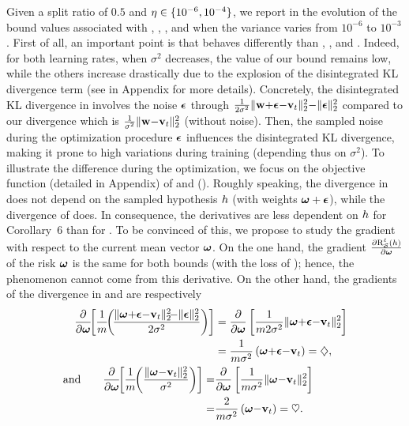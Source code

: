 Given a split ratio of $0.5$ and $\eta\in\{10^{-6}, 10^{-4}\}$, we report in  the evolution of the bound values associated with \algoours, \algorivasplata, \algoblanchard, and \algocatoni when the variance varies from $10^{-6}$ to $10^{-3}$.
First of all, an important point is that \algoours behaves differently than \algorivasplata, \algoblanchard, and \algocatoni.
Indeed, for both learning rates, when $\sigma^2$ decreases, the value of our bound remains low, while the others increase drastically due to the explosion of the disintegrated KL divergence term (see  in Appendix for more details).
Concretely, the disintegrated KL divergence in  involves the noise $\boldsymbol{\epsilon}$  through  $\frac{1}{2\sigma^2}\| \mathbf{w}{+}\boldsymbol{\epsilon}{-}\mathbf{v}_t\|_{2}^2{-}\|\boldsymbol{\epsilon}\|^2_{2}
$ compared to our divergence which is $\frac{1}{\sigma^2}\| \mathbf{w}{-}\mathbf{v}_t\|_{2}^2$ (without noise).
Then, the sampled noise during the optimization procedure $\boldsymbol{\epsilon}$ influences the disintegrated KL divergence, making it prone to high variations during training (depending thus on $\sigma^2$).
To illustrate the difference during the optimization, we focus on the objective function (detailed in Appendix) of  and  ().
Roughly speaking, the divergence in  does not depend on the sampled hypothesis $h$ (with weights $\boldsymbol{\omega}+\boldsymbol{\epsilon}$), while the divergence of  does. 
In consequence, the derivatives are less dependent on $h$ for Corollary~6 than for .
To be convinced of this, we propose to study the gradient with respect to the current mean vector $\boldsymbol{\omega}$.
On the one hand, the gradient $\frac{\partial \text{R}^{\ell}_{\mathcal{S}}(h)}{\partial \boldsymbol{\omega}}$ of the risk \wrt $\boldsymbol{\omega}$ is the same for both bounds (with the loss of \citet{DziugaiteRoy2018}); hence, the phenomenon cannot come from this derivative. 
On the other hand, the gradients of the divergence in   and  are respectively
\begin{align*}
    \frac{\partial}{\partial \omegabf}\!\!\LB\frac{1}{\m}\!\!\LP\!\frac{\| \omegabf{+}\epsilonbf{-}\vbf_\t\|^2_{2}\!{-}\|\epsilonbf\|^2_{2}}{2\sigma^2}\RP\RB &= \frac{\partial}{\partial \omegabf}\LB \frac{1}{m2\sigma^2}\|\omegabf{+}\epsilonbf{-}\vbf_\t\|_2^2 \RB\\
    &= \frac{1}{m\sigma^2}\LP \omegabf{+}\epsilonbf{-}\vbf_\t\RP = \diamondsuit,\\
    \text{and}\quad\quad  \frac{\partial}{\partial \omegabf}\!\!\LB\frac{1}{\m}\!\!\LP \frac{\|\omegabf{-}\vbf_\t\|_{2}^{2}}{\sigma^2}\RP\RB= &\frac{\partial}{\partial \omegabf}\LB \frac{1}{m\sigma^2}\|\omegabf{-}\vbf_\t\|_2^2 \RB\\
    = &\frac{2}{m\sigma^2}\LP \omegabf{-}\vbf_\t\RP = \heartsuit.
\end{align*}
